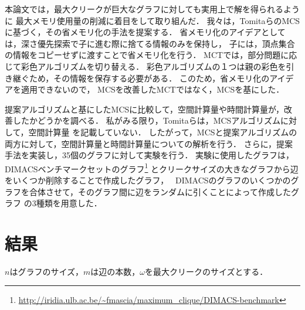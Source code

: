 本論文では，最大クリークが巨大なグラフに対しても実用上で解を得られるように
最大メモリ使用量の削減に着目をして取り組んだ．%
我々は，TomitaらのMCSに基づく，その省メモリ化の手法を提案する．
省メモリ化のアイデアとしては，深さ優先探索で子に進む際に捨てる情報のみを保持し，
子には，頂点集合の情報をコピーせずに渡すことで省メモリ化を行う．
MCTでは，部分問題に応じて彩色アルゴリズムを切り替える．
彩色アルゴリズムの１つは親の彩色を引き継ぐため，その情報を保存する必要がある．
このため，省メモリ化のアイデアを適用できないので，
MCSを改善したMCTではなく，MCSを基にした．

提案アルゴリズムと基にしたMCSに比較して，空間計算量や時間計算量が，改善したかどうかを調べる．
私がみる限り，Tomitaらは，MCSアルゴリズムに対して，空間計算量
を記載していない．
したがって，MCSと提案アルゴリズムの両方に対して，空間計算量と時間計算量についての解析を行う．
さらに，提案手法を実装し，35個のグラフに対して実験を行う．
実験に使用したグラフは，DIMACSベンチマークセットのグラフ\footnote{\url{http://iridia.ulb.ac.be/~fmascia/maximum_clique/DIMACS-benchmark}}
とクリークサイズの大きなグラフから辺をいくつか削除することで作成したグラフ，　
DIMACSのグラフのいくつかのグラフを合体させて，そのグラフ間に辺をランダムに引くことによって作成したグラフ
の3種類を用意した．

\section{結果}
 $n$はグラフのサイズ，$m$は辺の本数，$\omega$を最大クリークのサイズとする．

